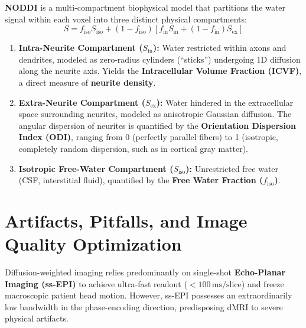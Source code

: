 \documentclass[11pt,a4paper]{article}
\begin{document}
\textbf{NODDI} is a multi-compartment biophysical model that partitions the water signal within each voxel into three distinct physical compartments:
\begin{equation}
    S = f_{\text{iso}} S_{\text{iso}} + (1 - f_{\text{iso}}) \left[ f_{\text{in}} S_{\text{in}} + (1 - f_{\text{in}}) S_{\text{ex}} \right]
\end{equation}
\begin{enumerate}[leftmargin=*]
    \item \textbf{Intra-Neurite Compartment ($S_{\text{in}}$):} Water restricted within axons and dendrites, modeled as zero-radius cylinders (``sticks'') undergoing 1D diffusion along the neurite axis. Yields the \textbf{Intracellular Volume Fraction (ICVF)}, a direct measure of \textbf{neurite density}.
    \item \textbf{Extra-Neurite Compartment ($S_{\text{ex}}$):} Water hindered in the extracellular space surrounding neurites, modeled as anisotropic Gaussian diffusion. The angular dispersion of neurites is quantified by the \textbf{Orientation Dispersion Index (ODI)}, ranging from 0 (perfectly parallel fibers) to 1 (isotropic, completely random dispersion, such as in cortical gray matter).
    \item \textbf{Isotropic Free-Water Compartment ($S_{\text{iso}}$):} Unrestricted free water (CSF, interstitial fluid), quantified by the \textbf{Free Water Fraction ($f_{\text{iso}}$)}.
\end{enumerate}

\newpage
\section{Artifacts, Pitfalls, and Image Quality Optimization}

Diffusion-weighted imaging relies predominantly on single-shot \textbf{Echo-Planar Imaging (ss-EPI)} to achieve ultra-fast readout ($< 100\,\text{ms/slice}$) and freeze macroscopic patient head motion. However, ss-EPI possesses an extraordinarily low bandwidth in the phase-encoding direction, predisposing dMRI to severe physical artifacts.
\end{document}
